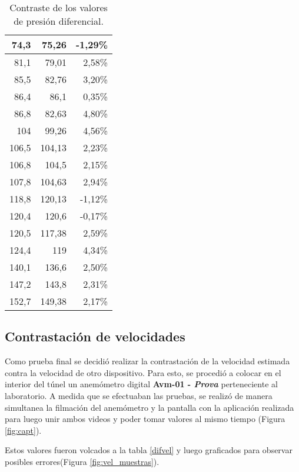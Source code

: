 \begin{table}[H]
\begin{tabular}{|r|r|r}
			74,3 & 75,26 & \multicolumn{1}{r|}{-1,29\%} \\ \hline
			81,1 & 79,01 & \multicolumn{1}{r|}{2,58\%} \\ \hline
			85,5 & 82,76 & \multicolumn{1}{r|}{3,20\%} \\ \hline
			86,4 & 86,1 & \multicolumn{1}{r|}{0,35\%} \\ \hline
			86,8 & 82,63 & \multicolumn{1}{r|}{4,80\%} \\ \hline
			104 & 99,26 & \multicolumn{1}{r|}{4,56\%} \\ \hline
			106,5 & 104,13 & \multicolumn{1}{r|}{2,23\%} \\ \hline
			106,8 & 104,5 & \multicolumn{1}{r|}{2,15\%} \\ \hline
			107,8 & 104,63 & \multicolumn{1}{r|}{2,94\%} \\ \hline
			118,8 & 120,13 & \multicolumn{1}{r|}{-1,12\%} \\ \hline
			120,4 & 120,6 & \multicolumn{1}{r|}{-0,17\%} \\ \hline
			120,5 & 117,38 & \multicolumn{1}{r|}{2,59\%} \\ \hline
			124,4 & 119 & \multicolumn{1}{r|}{4,34\%} \\ \hline
			140,1 & 136,6 & \multicolumn{1}{r|}{2,50\%} \\ \hline
			147,2 & 143,8 & \multicolumn{1}{r|}{2,31\%} \\ \hline
			152,7 & 149,38 & \multicolumn{1}{r|}{2,17\%} \\ \hline
		\end{tabular}
	\caption{Contraste de los valores de presión diferencial.}
	\label{difpres}

\end{table}

\subsection{Contrastación de velocidades}
Como prueba final se decidió realizar la contrastación de la velocidad estimada contra la velocidad de otro dispositivo. Para esto, se procedió a colocar en el interior del túnel un anemómetro digital \textbf{Avm-01 -\textit{ Prova}} perteneciente al laboratorio. A medida que se efectuaban las  pruebas, se realizó de manera simultanea la filmación del anemómetro y la pantalla con la aplicación realizada para luego unir ambos videos y poder tomar valores al mismo tiempo (Figura \ref{fig:capt}).

Estos valores fueron volcados a la tabla \ref{difvel} y luego graficados para observar posibles errores(Figura \ref{fig:vel_muestras}).

